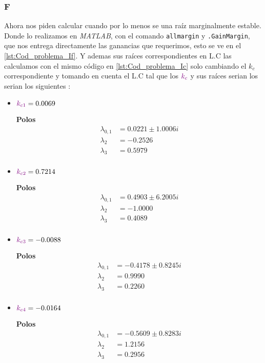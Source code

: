 \FloatBarrier
\subsubsection{F}%
Ahora nos piden calcular cuando por lo menos se una raíz marginalmente estable. 
Donde lo realizamos en \textit{MATLAB}, con el comando \verb|allmargin|  y  \verb|.GainMargin|, que nos entrega directamente las ganancias que requerimos, esto se ve en el \autoref{lst:Cod_problema_If}. Y ademas sus raíces correspondientes en L.C las calculamos con el mismo código en \autoref{lst:Cod_problema_Ic} solo cambiando el \(k_c\) correspondiente y tomando en cuenta el L.C tal que los \( \mathbin{\color{violet}k_c}\) y sus raíces serian los  serian los siguientes : 

\begin{multicols}{2}
  \begin{itemize}
      \item \(\mathbin{\color{violet}k_{c1}} = 0.0069\) 

        \textbf{Polos}
        \begin{align}
        \lambda_{0,1} &=0.0221 \pm 1.0006i \\
        \lambda_{2} &= -0.2526 \\
        \lambda_{3} &= 0.5979 \\
        \end{align}

      \item \(\mathbin{\color{violet}k_{c2}} = 0.7214\)

      \textbf{Polos}
      \begin{align}
        \lambda_{0,1} &= 0.4903 \pm 6.2005i \\
        \lambda_{2} &= -1.0000 \\
        \lambda_{3} &= 0.4089 \\
        \end{align}
  \end{itemize}
  \columnbreak
  \begin{itemize}
      \item \(\mathbin{\color{violet}k_{c3}} = -0.0088\)

      \textbf{Polos}
      \begin{align}
        \lambda_{0,1} &= -0.4178 \pm 0.8245i \\
        \lambda_{2} &= 0.9990 \\
        \lambda_{3} &= 0.2260 \\
        \end{align}

      \item \(\mathbin{\color{violet}k_{c4}} = -0.0164\)

      \textbf{Polos}
      \begin{align}
        \lambda_{0,1} &= -0.5609 \pm 0.8283i \\
        \lambda_{2} &= 1.2156  \\
        \lambda_{3} &= 0.2956  \\
        \end{align}
  \end{itemize}
\end{multicols}


